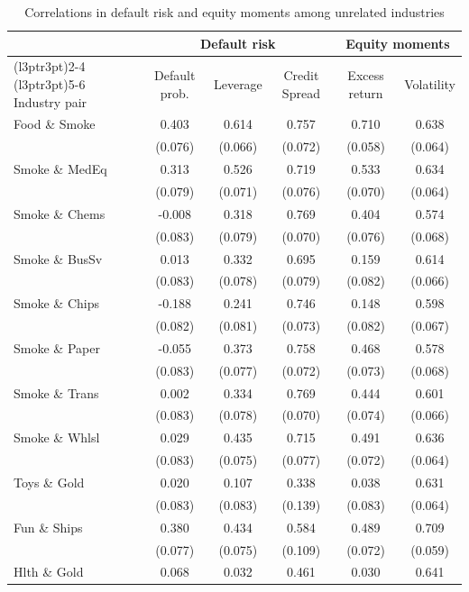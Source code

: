 \begin{table}

\caption{\label{tab:table-oa5}Correlations in default risk and equity moments among unrelated industries}
\centering
\begin{tabular}[t]{lccccc}
\toprule
\multicolumn{1}{c}{ } & \multicolumn{3}{c}{Default risk} & \multicolumn{2}{c}{Equity moments} \\
\cmidrule(l{3pt}r{3pt}){2-4} \cmidrule(l{3pt}r{3pt}){5-6}
Industry pair & Default prob. & Leverage & Credit Spread & Excess return & Volatility\\
\midrule
Food \& Smoke & 0.403 & 0.614 & 0.757 & 0.710 & 0.638\\
 & (0.076) & (0.066) & (0.072) & (0.058) & (0.064)\\
Smoke \& MedEq & 0.313 & 0.526 & 0.719 & 0.533 & 0.634\\
 & (0.079) & (0.071) & (0.076) & (0.070) & (0.064)\\
Smoke \& Chems & -0.008 & 0.318 & 0.769 & 0.404 & 0.574\\
\addlinespace
 & (0.083) & (0.079) & (0.070) & (0.076) & (0.068)\\
Smoke \& BusSv & 0.013 & 0.332 & 0.695 & 0.159 & 0.614\\
 & (0.083) & (0.078) & (0.079) & (0.082) & (0.066)\\
Smoke \& Chips & -0.188 & 0.241 & 0.746 & 0.148 & 0.598\\
 & (0.082) & (0.081) & (0.073) & (0.082) & (0.067)\\
\addlinespace
Smoke \& Paper & -0.055 & 0.373 & 0.758 & 0.468 & 0.578\\
 & (0.083) & (0.077) & (0.072) & (0.073) & (0.068)\\
Smoke \& Trans & 0.002 & 0.334 & 0.769 & 0.444 & 0.601\\
 & (0.083) & (0.078) & (0.070) & (0.074) & (0.066)\\
Smoke \& Whlsl & 0.029 & 0.435 & 0.715 & 0.491 & 0.636\\
\addlinespace
 & (0.083) & (0.075) & (0.077) & (0.072) & (0.064)\\
Toys \& Gold & 0.020 & 0.107 & 0.338 & 0.038 & 0.631\\
 & (0.083) & (0.083) & (0.139) & (0.083) & (0.064)\\
Fun \& Ships & 0.380 & 0.434 & 0.584 & 0.489 & 0.709\\
 & (0.077) & (0.075) & (0.109) & (0.072) & (0.059)\\
\addlinespace
Hlth \& Gold & 0.068 & 0.032 & 0.461 & 0.030 & 0.641\\

\end{tabular}
\end{table}
